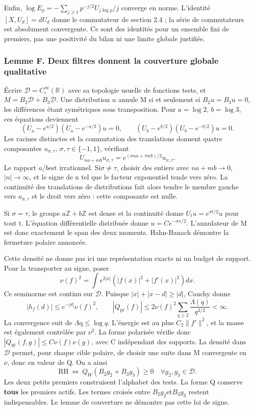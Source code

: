 \documentclass[
  10pt,
  a4paper,
]{article}
\begin{document}
Enfin, \(\log E_p=-\sum_{j\ge1}p^{-j/2}U_{j\log p}/j\) converge en
norme. L'identité \([X,U_d]=dU_d\) donne le commutateur de section 2.4 ;
la série de commutateurs est absolument convergente. Ce sont des
identités pour un ensemble fini de premiers, pas une positivité du bilan
ni une limite globale justifiée.

\hypertarget{lemme-f.-deux-filtres-donnent-la-couverture-globale-qualitative}{%
\subsubsection{Lemme F. Deux filtres donnent la couverture globale
qualitative}\label{lemme-f.-deux-filtres-donnent-la-couverture-globale-qualitative}}

Écrire \(\mathcal D=C_c^\infty(\mathbb R)\) avec sa topologie usuelle de
fonctions tests, et \(M=B_2\mathcal D+B_3\mathcal D\). Une distribution
\(u\) annule M si et seulement si \(B_2u=B_3u=0\), les différences étant
symétriques sous transposition. Pour \(a=\log2\), \(b=\log3\), ces
équations deviennent \[
(U_a-e^{a/2})(U_a-e^{-a/2})u=0,\qquad
(U_b-e^{b/2})(U_b-e^{-b/2})u=0.
\] Les racines distinctes et la commutation des translations donnent
quatre composantes \(u_{\sigma,\tau}\), \(\sigma,\tau\in\{-1,1\}\),
vérifiant \[
U_{na+mb}u_{\sigma,\tau}
=e^{(\sigma na+\tau mb)/2}u_{\sigma,\tau}.
\] Le rapport \(a/b\)est irrationnel. Si\(\sigma\ne\tau\), choisir des
entiers avec \(na+mb\to0\), \(|n|\to\infty\), et le signe de n tel que
le facteur exponentiel tende vers zéro. La continuité des translations
de distributions fait alors tendre le membre gauche vers
\(u_{\sigma,\tau}\) et le droit vers zéro : cette composante est nulle.

Si \(\sigma=\tau\), le groupe \(a\mathbb Z+b\mathbb Z\) est dense et la
continuité donne \(U_tu=e^{\sigma t/2}u\) pour tout t. L'équation
différentielle distribuée donne \(u=Ce^{-\sigma x/2}\). L'annulateur de
M est donc exactement le span des deux moments. Hahn-Banach démontre la
fermeture polaire annoncée.

Cette densité ne donne pas ici une représentation exacte ni un budget de
support. Pour la transporter au signe, poser \[
\nu(f)^2=\int e^{2|x|}(|f(x)|^2+|f'(x)|^2)dx.
\] Ce seminorme est continu sur \(\mathcal D\). Puisque
\(|x|+|x-d|\ge|d|\), Cauchy donne \[
|h_f(d)|\le e^{-|d|}\nu(f)^2,\qquad
|Q_{\mathrm{pr}}(f)|\le2\nu(f)^2\sum_{q\ge2}\frac{\Lambda(q)}{q^{3/2}}<\infty.
\] La convergence suit de \(\Lambda\)q\(\le\log q\). L'énergie est au
plus \(C_2\|f'\|^2\), et la masse est également contrôlée par \(\nu^2\).
La forme polarisée vérifie donc \(|Q_W(f,g)|\le C\nu(f)\nu(g)\), avec C
indépendant des supports. La densité dans \(\mathcal D\) permet, pour
chaque cible polaire, de choisir une suite dans M convergente en
\(\nu\), donc en valeur de Q. On a ainsi \[
\boxed{\mathrm{RH}\ \Longleftrightarrow\
Q_W(B_2g_2+B_3g_3)\ge0\quad\forall g_2,g_3\in\mathcal D.}
\] Les deux petits premiers construisent l'alphabet des tests. La forme
Q conserve \textbf{tous} les premiers actifs. Les termes croisés entre
\(B_2g_2\)et\(B_3g_3\) restent indispensables. Le lemme de couverture ne
démontre pas cette loi de signe.
\end{document}
